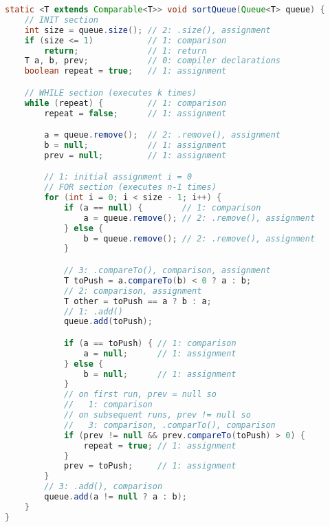 \documentclass[11pt,a4paper]{article} %
\begin{document}
\newpage
\begin{lstlisting}[language=Java]
static <T extends Comparable<T>> void sortQueue(Queue<T> queue) {
    // INIT section
    int size = queue.size(); // 2: .size(), assignment
    if (size <= 1)           // 1: comparison
        return;              // 1: return
    T a, b, prev;            // 0: compiler declarations
    boolean repeat = true;   // 1: assignment

    // WHILE section (executes k times)
    while (repeat) {         // 1: comparison
        repeat = false;      // 1: assignment

        a = queue.remove();  // 2: .remove(), assignment
        b = null;            // 1: assignment
        prev = null;         // 1: assignment

        // 1: initial assignment i = 0
        // FOR section (executes n-1 times)
        for (int i = 0; i < size - 1; i++) {
            if (a == null) {        // 1: comparison
                a = queue.remove(); // 2: .remove(), assignment
            } else {
                b = queue.remove(); // 2: .remove(), assignment
            }

            // 3: .compareTo(), comparison, assignment
            T toPush = a.compareTo(b) < 0 ? a : b;
            // 2: comparison, assignment
            T other = toPush == a ? b : a;
            // 1: .add()
            queue.add(toPush);

            if (a == toPush) { // 1: comparison
                a = null;      // 1: assignment
            } else {
                b = null;      // 1: assignment
            }
            // on first run, prev = null so
            //   1: comparison
            // on subsequent runs, prev != null so
            //   3: comparison, .comparTo(), comparison
            if (prev != null && prev.compareTo(toPush) > 0) {
                repeat = true; // 1: assignment
            }
            prev = toPush;     // 1: assignment
        }
        // 3: .add(), comparison
        queue.add(a != null ? a : b);
    }
}
\end{lstlisting}
\end{document}
